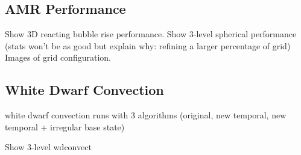 \subsection{AMR Performance}
Show 3D reacting bubble rise performance.
Show 3-level spherical performance (stats won't be as good but explain why: refining a larger percentage of grid)
Images of grid configuration.

\subsection{White Dwarf Convection}
white dwarf convection runs with 3 algorithms (original, new temporal, new temporal + irregular base state)

Show 3-level wdconvect
